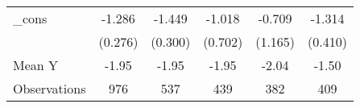 {\begin{tabular}{l*{5}{c}}
\addlinespace
\_cons      &      -1.286\sym{***}&      -1.449\sym{***}&      -1.018         &      -0.709         &      -1.314\sym{***}\\
            &     (0.276)         &     (0.300)         &     (0.702)         &     (1.165)         &     (0.410)         \\
\midrule
Mean Y      &       -1.95         &       -1.95         &       -1.95         &       -2.04         &       -1.50         \\
Observations&         976         &         537         &         439         &         382         &         409         \\
\bottomrule
\end{tabular}
}
